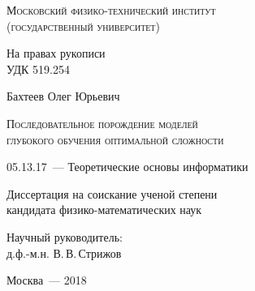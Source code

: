 \thispagestyle{empty}


\begin{titlepage}
\begin{center}
\textsc{Московский физико-технический институт \\ (государственный университет)}\\
\end{center}
\vspace{1.5cm}
\begin{flushright}
{На правах рукописи\\
УДК 519.254}
\end{flushright}
\vspace{1.5cm}
\begin{center}
{Бахтеев Олег Юрьевич}
\par
\vspace{2cm}
\textsc{Последовательное порождение моделей \\глубокого обучения оптимальной сложности}
\par
\vspace{2cm}
{05.13.17~--- Теоретические основы информатики}
\par
\vspace{2cm}
{Диссертация на соискание ученой степени\\
кандидата физико-математических наук}
\end{center}
\vspace{2cm}
\hfill\parbox{8,4cm}{Научный руководитель:
\\д.ф.-м.н. В.\,В.\,Стрижов}
\par
\vspace{3.5cm}
\begin{center}
{Москва~--- 2018}
\end{center}
\end{titlepage}



\newpage{}
